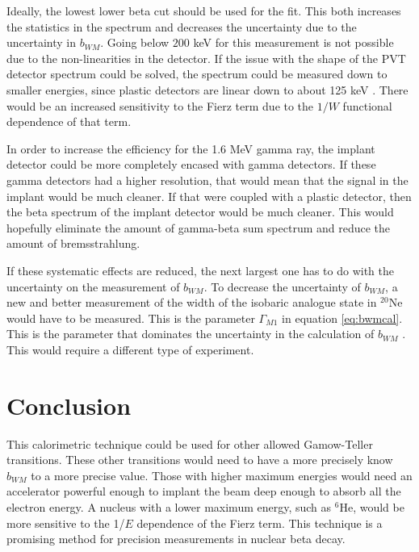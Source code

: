 \documentclass[../MaxHughesThesis.tex]{subfiles}
\begin{document}
Ideally, the lowest lower beta cut should be used for the fit.
This both increases the statistics in the spectrum and decreases the uncertainty due to the uncertainty in $b_{WM}$.
Going below $200$ keV for this measurement is not possible due to the non-linearities in the detector.
If the issue with the shape of the PVT detector spectrum could be solved, the spectrum could be measured down to smaller energies, since plastic detectors are linear down to about 125 keV \cite{Kno10}. 
There would be an increased sensitivity to the Fierz term due to the $1/W$ functional dependence of that term.

In order to increase the efficiency for the 1.6 MeV gamma ray, the implant detector could be more completely encased with gamma detectors.
If these gamma detectors had a higher resolution, that would mean that the signal in the implant would be much cleaner.
If that were coupled with a plastic detector, then the beta spectrum of the implant detector would be much cleaner.
This would hopefully eliminate the amount of gamma-beta sum spectrum and reduce the amount of bremsstrahlung.

If these systematic effects are reduced, the next largest one has to do with the uncertainty on the measurement of $b_{WM}$.
To decrease the uncertainty of $b_{WM}$,  a new and better measurement of the width of the isobaric analogue state in $^{20}$Ne would have to be measured.
This is the parameter $\Gamma_{M1}$ in equation \ref{eq:bwmcal}.
This is the parameter that dominates the uncertainty in  the calculation of $b_{WM}$ \cite{Min11}.
This would require a different type of experiment.

\section{Conclusion}
This calorimetric technique could be used for other allowed Gamow-Teller transitions.
These other transitions would need to have a more precisely know $b_{WM}$ to a more precise value.
Those with higher maximum energies would need an accelerator powerful enough to implant the beam deep enough to absorb all the electron energy.
A nucleus with a lower maximum energy, such as $^{6}$He, would be more sensitive to the 1/$E$ dependence of the Fierz term. 
This technique is a promising method for precision measurements in nuclear beta decay.
\end{document}
